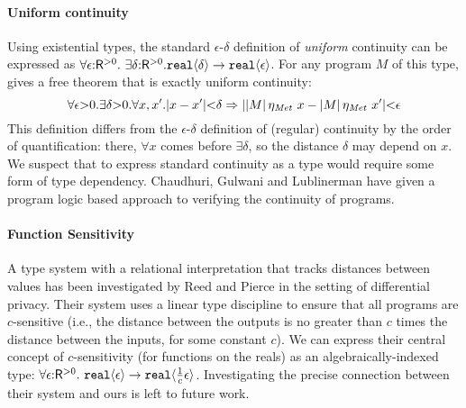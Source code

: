 \paragraph{Uniform continuity}
Using %
existential types, %
the standard $\epsilon$-$\delta$ definition of
\emph{uniform} continuity can be expressed as %
$  \forall \epsilon \mathord: \mathsf{R}^{>0}.\ \exists \delta\mathord: \mathsf{R}^{>0}.\\ \textup{\texttt{real}}\langle \delta \rangle \to \textup{\texttt{real}}\langle \epsilon \rangle$.
For any program $M$ of this type, %
 gives a free theorem that is exactly 
uniform continuity:
\begin{displaymath}
  \forall \epsilon \mathord> 0. \exists \delta \mathord> 0. \forall x,x'. \lvert x - x' \rvert \mathord< \delta \Rightarrow \lvert \left| M\right|\eta_{\mathit{Met}}~x - \left| M\right|\eta_{\mathit{Met}}~x' \rvert \mathord< \epsilon
\end{displaymath}
This definition differs from the $\epsilon$-$\delta$ definition of
(regular) continuity by the order of quantification:
there, $\forall x$ comes before $\exists \delta$, so the distance
$\delta$ may depend on %
$x$. We suspect that to express standard continuity as a type would
require some form of type dependency. Chaudhuri, Gulwani and
Lublinerman \cite{chaudhuri10continuity} have given a program logic
based approach to verifying the continuity of programs.

\paragraph{Function Sensitivity}
A type system with a relational interpretation that tracks distances
between values has %
been investigated by Reed and Pierce \cite{reed10distance} in the
setting of differential privacy. Their system uses a linear type
discipline to ensure that all programs are $c$-sensitive (i.e., the
distance between the outputs is no greater than $c$ times the
distance between the inputs, for some constant $c$). We can express
their central concept of $c$-sensitivity (for functions on the reals)
as an algebraically-indexed type: $\forall
\epsilon\mathord:\mathsf{R}^{>0}.\ \textup{\texttt{real}}\langle \epsilon \rangle \to
\textup{\texttt{real}}\langle \frac{1}{c}\epsilon \rangle$. Investigating the precise
connection between their system and ours is left to future work.


